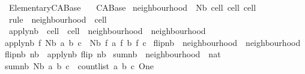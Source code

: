 %
\begin{isabellebody}%
%
%
\isadelimdocument
%
\endisadelimdocument
%
\isatagdocument
%
\isamarkuptrue%
%
\endisatagdocument
{\isafolddocument}%
%
\isadelimdocument
%
\endisadelimdocument
%
\isadelimtheory
%
\endisadelimtheory
%
\isatagtheory
{}\isamarkupfalse%
\ Elementary{\isacharunderscore}CA{\isacharunderscore}Base\isanewline
\ \ \ CA{\isacharunderscore}Base\isanewline
{}%
\endisatagtheory
{\isafoldtheory}%
%
\isadelimtheory
\isanewline
%
\endisadelimtheory
\isanewline
{}\isamarkupfalse%
\ neighbourhood\ {\isacharequal}\ Nb\ cell\ cell\ cell\isanewline
{}\isamarkupfalse%
\ rule\ {\isacharequal}\ {\isachardoublequoteopen}neighbourhood\ {\isasymRightarrow}\ cell{\isachardoublequoteclose}\isanewline
\isanewline
{}\isamarkupfalse%
\ apply{\isacharunderscore}nb\ {\isacharcolon}{\isacharcolon}\ {\isachardoublequoteopen}{\isacharparenleft}cell\ {\isasymRightarrow}\ cell{\isacharparenright}\ {\isasymRightarrow}\ neighbourhood\ {\isasymRightarrow}\ neighbourhood{\isachardoublequoteclose}\ \isanewline
{\isachardoublequoteopen}apply{\isacharunderscore}nb\ f\ {\isacharparenleft}Nb\ a\ b\ c{\isacharparenright}\ {\isacharequal}\ Nb\ {\isacharparenleft}f\ a{\isacharparenright}\ {\isacharparenleft}f\ b{\isacharparenright}\ {\isacharparenleft}f\ c{\isacharparenright}{\isachardoublequoteclose}\isanewline
\isanewline
{}\isamarkupfalse%
\ flip{\isacharunderscore}nb\ {\isacharcolon}{\isacharcolon}\ {\isachardoublequoteopen}neighbourhood\ {\isasymRightarrow}\ neighbourhood{\isachardoublequoteclose}\ \isanewline
{\isachardoublequoteopen}flip{\isacharunderscore}nb\ nb\ {\isacharequal}\ apply{\isacharunderscore}nb\ flip\ nb{\isachardoublequoteclose}\isanewline
\isanewline
{}\isamarkupfalse%
\ sum{\isacharunderscore}nb\ {\isacharcolon}{\isacharcolon}\ {\isachardoublequoteopen}neighbourhood\ {\isasymRightarrow}\ nat{\isachardoublequoteclose}\ \isanewline
{\isachardoublequoteopen}sum{\isacharunderscore}nb\ {\isacharparenleft}Nb\ a\ b\ c{\isacharparenright}\ {\isacharequal}\ count{\isacharunderscore}list\ {\isacharbrackleft}a{\isacharcomma}\ b{\isacharcomma}\ c{\isacharbrackright}\ One{\isachardoublequoteclose}%
\isadelimdocument
%
\endisadelimdocument
%
\isatagdocument
%
\end{isabellebody}
